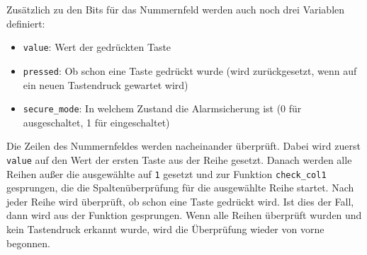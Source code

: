 Zusätzlich zu den Bits für das Nummernfeld werden auch noch drei
Variablen definiert:

\begin{itemize}
\itemsep1pt\parskip0pt
\item
  \texttt{value}: Wert der gedrückten Taste
\item
  \texttt{pressed}: Ob schon eine Taste gedrückt wurde (wird
  zurückgesetzt, wenn auf ein neuen Tastendruck gewartet wird)
\item
  \texttt{secure\_mode}: In welchem Zustand die Alarmsicherung ist (0
  für ausgeschaltet, 1 für eingeschaltet)
\end{itemize}

\begin{Shaded}
\begin{Highlighting}[]

                     
     

     
 
     
     
 
     
 
     
     
 
     

     
\end{Highlighting}
\end{Shaded}

Die Zeilen des Nummernfeldes werden nacheinander überprüft. Dabei wird
zuerst \texttt{value} auf den Wert der ersten Taste aus der Reihe
gesetzt. Danach werden alle Reihen außer die ausgewählte auf \texttt{1}
gesetzt und zur Funktion \texttt{check\_col1} gesprungen, die die
Spaltenüberprüfung für die ausgewählte Reihe startet. Nach jeder Reihe
wird überprüft, ob schon eine Taste gedrückt wird. Ist dies der Fall,
dann wird aus der Funktion gesprungen. Wenn alle Reihen überprüft wurden
und kein Tastendruck erkannt wurde, wird die Überprüfung wieder von vorne
begonnen.

